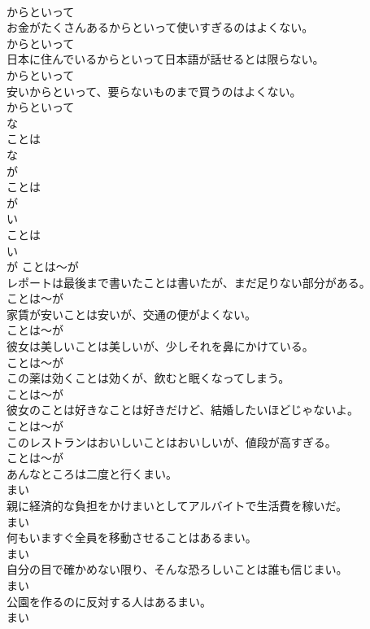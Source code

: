 \documentclass[8pt]{extreport}
\begin{document}
\begin{CJK}{UTF8}{min}
\\	からといって
\\	お金がたくさんあるからといって使いすぎるのはよくない。	
\\	からといって
\\	日本に住んでいるからといって日本語が話せるとは限らない。	
\\	からといって
\\	安いからといって、要らないものまで買うのはよくない。	
\\	からといって
\\	な
\\	ことは 
\\	な
\\	が	
\\	ことは 
\\	が	
\\	い
\\	ことは 
\\	い
\\	が	ことは～が
\\	レポートは最後まで書いたことは書いたが、まだ足りない部分がある。	
\\	ことは～が
\\	家賃が安いことは安いが、交通の便がよくない。	
\\	ことは～が
\\	彼女は美しいことは美しいが、少しそれを鼻にかけている。	
\\	ことは～が
\\	この薬は効くことは効くが、飲むと眠くなってしまう。	
\\	ことは～が
\\	彼女のことは好きなことは好きだけど、結婚したいほどじゃないよ。	
\\	ことは～が
\\	このレストランはおいしいことはおいしいが、値段が高すぎる。	
\\	ことは～が
\\	あんなところは二度と行くまい。	
\\	まい
\\	親に経済的な負担をかけまいとしてアルバイトで生活費を稼いだ。	
\\	まい
\\	何もいますぐ全員を移動させることはあるまい。	
\\	まい
\\	自分の目で確かめない限り、そんな恐ろしいことは誰も信じまい。	
\\	まい
\\	公園を作るのに反対する人はあるまい。	
\\	まい

\end{CJK}
\end{document}
